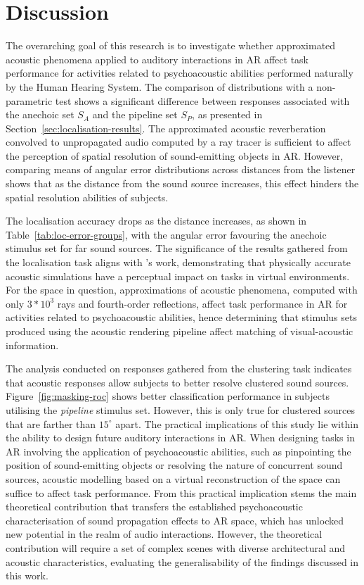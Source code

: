 \section{Discussion}
The overarching goal of this research is to investigate whether approximated acoustic phenomena applied to auditory interactions in AR affect task performance for activities related to psychoacoustic abilities performed naturally by the Human Hearing System.
The comparison of distributions with a non-parametric test shows a significant difference between responses associated with the anechoic set $S_A$ and the pipeline set $S_P$, as presented in Section~\ref{sec:localisation-results}. The approximated acoustic reverberation convolved to unpropagated audio computed by a ray tracer is sufficient to affect the perception of spatial resolution of sound-emitting objects in AR. However, comparing means of angular error distributions across distances from the listener shows that as the distance from the sound source increases, this effect hinders the spatial resolution abilities of subjects. \par
The localisation accuracy drops as the distance increases, as shown in Table~\ref{tab:loc-error-groups}, with the angular error favouring the anechoic stimulus set for far sound sources. The significance of the results gathered from the localisation task aligns with \cite{rungta2016psychoacoustic}'s work, demonstrating that physically accurate acoustic simulations have a perceptual impact on tasks in virtual environments. For the space in question, approximations of acoustic phenomena, computed with only $3*10^3$ rays and fourth-order reflections, affect task performance in AR for activities related to psychoacoustic abilities, hence determining that stimulus sets produced using the acoustic rendering pipeline affect matching of visual-acoustic information. \par
The analysis conducted on responses gathered from the clustering task indicates that acoustic responses allow subjects to better resolve clustered sound sources. Figure~\ref{fig:masking-roc} shows better classification performance in subjects utilising the \emph{pipeline} stimulus set. However, this is only true for clustered sources that are farther than $15^\circ$ apart.
The practical implications of this study lie within the ability to design future auditory interactions in AR. When designing tasks in AR involving the application of psychoacoustic abilities, such as pinpointing the position of sound-emitting objects or resolving the nature of concurrent sound sources, acoustic modelling based on a virtual reconstruction of the space can suffice to affect task performance. From this practical implication stems the main theoretical contribution that transfers the established psychoacoustic characterisation of sound propagation effects to AR space, which has unlocked new potential in the realm of audio interactions. However, the theoretical contribution will require a set of complex scenes with diverse architectural and acoustic characteristics, evaluating the generalisability of the findings discussed in this work. \par
